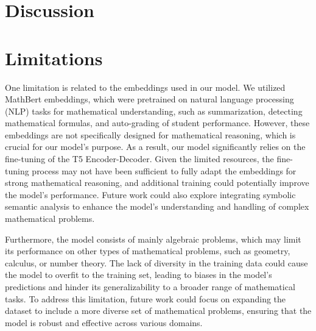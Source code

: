 \documentclass{article}
\begin{document}
\section{Discussion}


\section{Limitations}


One limitation is related to the embeddings used in our model. We utilized MathBert embeddings, which were pretrained on natural language processing (NLP) tasks for mathematical understanding, such as summarization, detecting mathematical formulas, and auto-grading of student performance. However, these embeddings are not specifically designed for mathematical reasoning, which is crucial for our model's purpose. As a result, our model significantly relies on the fine-tuning of the T5 Encoder-Decoder. Given the limited resources, the fine-tuning process may not have been sufficient to fully adapt the embeddings for strong mathematical reasoning, and additional training could potentially improve the model's performance. Future work could also explore integrating symbolic semantic analysis to enhance the model's understanding and handling of complex mathematical problems. \cite{mathBERT}

Furthermore, the model consists of mainly algebraic problems, which may limit its performance on other types of mathematical problems, such as geometry, calculus, or number theory. The lack of diversity in the training data could cause the model to overfit to the training set, leading to biases in the model's predictions and hinder its generalizability to a broader range of mathematical tasks. To address this limitation, future work could focus on expanding the dataset to include a more diverse set of mathematical problems, ensuring that the model is robust and effective across various domains.
\end{document}
